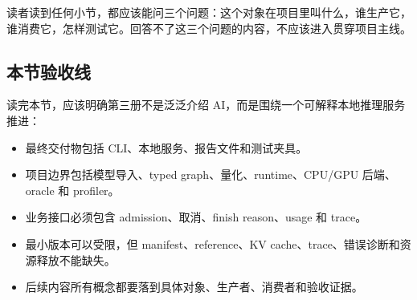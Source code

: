 读者读到任何小节，都应该能问三个问题：这个对象在项目里叫什么，谁生产它，谁消费它，怎样测试它。回答不了这三个问题的内容，不应该进入贯穿项目主线。

\subsection{本节验收线}

读完本节，应该明确第三册不是泛泛介绍 AI，而是围绕一个可解释本地推理服务推进：

\begin{itemize}
  \item 最终交付物包括 CLI、本地服务、报告文件和测试夹具。
  \item 项目边界包括模型导入、typed graph、量化、runtime、CPU/GPU 后端、oracle 和 profiler。
  \item 业务接口必须包含 admission、取消、finish reason、usage 和 trace。
  \item 最小版本可以受限，但 manifest、reference、KV cache、trace、错误诊断和资源释放不能缺失。
  \item 后续内容所有概念都要落到具体对象、生产者、消费者和验收证据。
\end{itemize}
